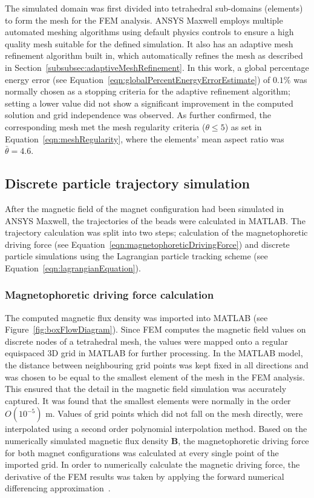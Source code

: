The simulated domain was first divided into tetrahedral sub-domains (elements) to form the mesh for the FEM analysis. ANSYS Maxwell employs multiple automated meshing algorithms using default physics controls to ensure a high quality mesh suitable for the defined simulation. It also has an adaptive mesh refinement algorithm built in, which automatically refines the mesh as described in Section~\ref{subsubsec:adaptiveMeshRefinement}. In this work, a global percentage energy error (see Equation~\ref{eqn:globalPercentEnergyErrorEstimate}) of $0.1\%$ was normally chosen as a stopping criteria for the adaptive refinement algorithm; setting a lower value did not show a significant improvement in the computed solution and grid independence was observed. As further confirmed, the corresponding mesh met the mesh regularity criteria  ($\theta\leq 5$) as set in Equation~\ref{eqn:meshRegularity}, where the elements' mean aspect ratio was $\bar{\theta}=4.6$.

\subsection{Discrete particle trajectory simulation}\label{subsec:lagrangianPartikelTracking}
After the magnetic field of the magnet configuration had been simulated in ANSYS Maxwell, the trajectories of the beads were calculated in MATLAB. The trajectory calculation was split into two steps; calculation of the magnetophoretic driving force (see Equation~\ref{eqn:magnetophoreticDrivingForce}) and discrete particle simulations using the Lagrangian particle tracking scheme (see Equation~\ref{eqn:lagrangianEquation}).

\subsubsection{Magnetophoretic driving force calculation}\label{subsubsec:magnetophoreticDrivingForceCalculation}
The computed magnetic flux density was imported into MATLAB (see Figure~\ref{fig:boxFlowDiagram}). Since FEM computes the magnetic field values on discrete nodes of a tetrahedral mesh, the values were mapped onto a regular equispaced 3D grid in MATLAB for further processing. In the MATLAB model, the distance between neighbouring grid points was kept fixed in all directions and was chosen to be equal to the smallest element of the mesh in the FEM analysis. This ensured that the detail in the magnetic field simulation was accurately captured. It was found that the smallest elements were normally in the order $O(10^{-5})$ m. Values of grid points which did not fall on the mesh directly, were interpolated using a second order polynomial interpolation method. Based on the numerically simulated magnetic flux density $\mathbf{B}$, the magnetophoretic driving force for both magnet configurations was calculated at every single point of the imported grid. In order to numerically calculate the magnetic driving force, the derivative of the FEM results was taken by applying the forward numerical differencing approximation~\cite{Burden2001}.

